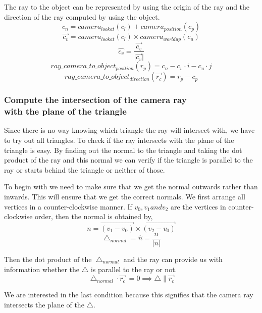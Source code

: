 \documentclass[paper=a4, fontsize=11pt]{scrartcl}
\numberwithin{equation}{section}		%
\numberwithin{figure}{section}			%
\numberwithin{table}{section}				%
\begin{document}
The ray to the object can be represented by using the origin of the ray and the direction of the ray computed by using the object.
\[c_{n} = camera_{lookat}(c_{l}) + camera_{position}(c_{p}) \]
\[\overrightarrow{c_{v}} = camera_{lookat}(c_{l}) \times camera_{worldup}(c_{u}) \]
\[\hat{c_{v}} = \dfrac{\overrightarrow{c_{v}}}{\lvert \overrightarrow{c_{v}} \rvert} \]
\[ray\_camera\_to\_object_{position} (r_{p}) = c_{n} - c_{v} \cdot i - c_{u} \cdot j\]
\[ray\_camera\_to\_object_{direction} (\overrightarrow{r_{c}}) = r_{p} - c_{p} \]

\subsubsection{Compute the intersection of the camera ray\\ with the plane of the triangle}
Since there is no way knowing which triangle the ray will intersect with, we have to try out all triangles.
To check if the ray intersects with the plane of the triangle is easy. By finding out the normal to the triangle and taking the dot product of the ray and this normal we can verify if the triangle is parallel to the ray or starts behind the triangle or neither of those. 
\par
To begin with we need to make sure that we get the normal outwards rather than inwards. This will ensure that we get the correct normals. We first arrange all vertices in a counter-clockwise manner. If $v_{0}, v_{1} and v_{2}$ are the vertices in counter-clockwise order, then the normal is obtained by,
\[{n} = \overrightarrow{(v_{1}-v_{0})} \times \overrightarrow{(v_{2}-v_{0})}\]
\[\bigtriangleup _{normal} = \hat{n} = \dfrac{n}{\lvert n \rvert}\]

Then the dot product of the $\bigtriangleup _{normal}$ and the ray can provide us with information whether the $\bigtriangleup$ is parallel to the ray or not.
\[ \bigtriangleup _{normal} \cdot \overrightarrow{r_{c}}\ = 0 \implies \bigtriangleup \parallel \overrightarrow{r_{c}}\]

We are interested in the last condition because this signifies that the camera ray intersects the plane of the $\bigtriangleup$.
\end{document}

